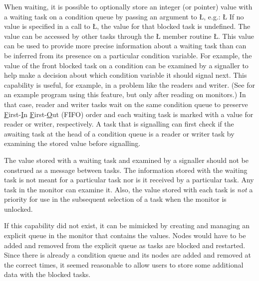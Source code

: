 \documentclass[openright,twoside]{report}
\begin{document}
When waiting, it is possible to optionally store an integer (or pointer) value with a waiting task on a condition queue by passing an argument to \LGinlinetrue\LGbegin\lgrinde\L{}\endlgrinde\LGend{}, e.g.:
\LGinlinefalse\LGbegin\lgrinde
\L{}
\endlgrinde\LGend
If no value is specified in a call to \LGinlinetrue\LGbegin\lgrinde\L{}\endlgrinde\LGend{}, the value for that blocked task is undefined.
The value can be accessed by other tasks through the \LGinlinetrue\LGbegin\lgrinde\L{}\endlgrinde\LGend{} member routine \LGinlinetrue\LGbegin\lgrinde\L{}\endlgrinde\LGend{}.
This value can be used to provide more precise information about a waiting task than can be inferred from its presence on a particular condition variable.
For example, the value of the front blocked task on a condition can be examined by a signaller to help make a decision about which condition variable it should signal next.
This capability is useful, for example, in a problem like the readers and writer.
(See  for an example program using this feature, but only after reading  on monitors.)
In that case, reader and writer tasks wait on the same condition queue to preserve \underline{F}irst-\underline{I}n \underline{F}irst-\underline{O}ut (FIFO) order and each waiting task is marked with a value for reader or writer, respectively.
A task that is signalling can first check if the awaiting task at the head of a condition queue is a reader or writer task by examining the stored value before signalling.

\begin{annotation}
The value stored with a waiting task and examined by a signaller should not be construed as a message between tasks.
The information stored with the waiting task is not meant for a particular task nor is it received by a particular task.
Any task in the monitor can examine it.
Also, the value stored with each task is \emph{not} a priority for use in the subsequent selection of a task when the monitor is unlocked.

If this capability did not exist, it can be mimicked by creating and managing an explicit queue in the monitor that contains the values.
Nodes would have to be added and removed from the explicit queue as tasks are blocked and restarted.
Since there is already a condition queue and its nodes are added and removed at the correct times, it seemed reasonable to allow users to store some additional data with the blocked tasks.
\end{annotation}
\end{document}
